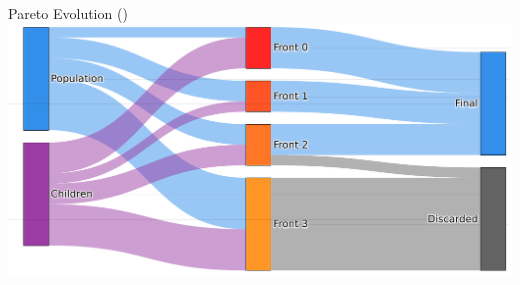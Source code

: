 \documentclass[aspectratio=169]{beamer}
\begin{document}
\begin{frame}{Pareto Evolution \color{white}(\cite{srinivas1994muiltiobjective})}
    \includegraphics[width=1.0\linewidth, keepaspectratio]{figures/paretoev.pdf}
\end{frame}
\end{document}
